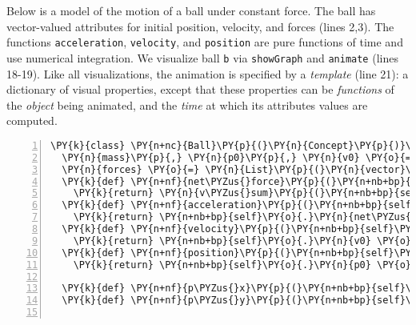 \documentclass[letterpaper,compsoc,twoside]{IEEEtran}
\makeatletter
\def\PY@reset{\let\PY@it=\relax \let\PY@bf=\relax \let\PY@ul=\relax \let\PY@tc=\relax \let\PY@bc=\relax \let\PY@ff=\relax}
\def\PY@tok#1{\csname PY@tok@#1\endcsname}
\def\PY@toks#1+{\ifx\relax#1\empty\else \PY@tok{#1}\expandafter\PY@toks\fi}
\def\PY@do#1{\PY@bc{\PY@tc{\PY@ul{\PY@it{\PY@bf{\PY@ff{#1}}}}}}}
\def\PY#1#2{\PY@reset\PY@toks#1+\relax+\PY@do{#2}}
\def\PYZus{\char`\_}
\makeatother
\begin{document}
Below is a model of the motion of a ball under constant force. The ball has vector-valued attributes for initial position, velocity, and forces (lines 2,3). The functions \texttt{acceleration}, \texttt{velocity}, and \texttt{position} are pure functions of time and use numerical integration. We visualize ball \texttt{b} via \texttt{showGraph} and \texttt{animate} (lines 18-19). Like all visualizations, the animation is specified by a \emph{template} (line 21): a dictionary of visual properties, except that these properties can be \emph{functions} of the \emph{object} being animated, and the \emph{time} at which its attributes values are computed.\begin{Verbatim}[commandchars=\\\{\},numbers=left,firstnumber=1,stepnumber=1,fontsize=\footnotesize,xleftmargin=2.25mm,numbersep=3pt]
\PY{k}{class} \PY{n+nc}{Ball}\PY{p}{(}\PY{n}{Concept}\PY{p}{)}\PY{p}{:}
  \PY{n}{mass}\PY{p}{,} \PY{n}{p0}\PY{p}{,} \PY{n}{v0} \PY{o}{=} \PY{n}{Float}\PY{p}{,} \PY{n}{Instance}\PY{p}{(}\PY{n}{vector}\PY{p}{)}\PY{p}{,} \PY{o}{.}\PY{o}{.}\PY{o}{.}
  \PY{n}{forces} \PY{o}{=} \PY{n}{List}\PY{p}{(}\PY{n}{vector}\PY{p}{)}
  \PY{k}{def} \PY{n+nf}{net\PYZus{}force}\PY{p}{(}\PY{n+nb+bp}{self}\PY{p}{)}\PY{p}{:}
    \PY{k}{return} \PY{n}{v\PYZus{}sum}\PY{p}{(}\PY{n+nb+bp}{self}\PY{o}{.}\PY{n}{forces}\PY{p}{)}
  \PY{k}{def} \PY{n+nf}{acceleration}\PY{p}{(}\PY{n+nb+bp}{self}\PY{p}{,} \PY{n}{time}\PY{p}{)}\PY{p}{:}
    \PY{k}{return} \PY{n+nb+bp}{self}\PY{o}{.}\PY{n}{net\PYZus{}force}\PY{p}{(}\PY{p}{)} \PY{o}{/} \PY{n+nb+bp}{self}\PY{o}{.}\PY{n}{mass}
  \PY{k}{def} \PY{n+nf}{velocity}\PY{p}{(}\PY{n+nb+bp}{self}\PY{p}{,} \PY{n}{time}\PY{p}{)}\PY{p}{:}
    \PY{k}{return} \PY{n+nb+bp}{self}\PY{o}{.}\PY{n}{v0} \PY{o}{+} \PY{n}{v\PYZus{}integrate}\PY{p}{(}\PY{n+nb+bp}{self}\PY{o}{.}\PY{n}{acceleration}\PY{p}{,} \PY{n}{time}\PY{p}{)}
  \PY{k}{def} \PY{n+nf}{position}\PY{p}{(}\PY{n+nb+bp}{self}\PY{p}{,} \PY{n}{time}\PY{p}{)}\PY{p}{:}
    \PY{k}{return} \PY{n+nb+bp}{self}\PY{o}{.}\PY{n}{p0} \PY{o}{+} \PY{n}{v\PYZus{}integrate}\PY{p}{(}\PY{n+nb+bp}{self}\PY{o}{.}\PY{n}{velocity}\PY{p}{,} \PY{n}{time}\PY{p}{)}

  \PY{k}{def} \PY{n+nf}{p\PYZus{}x}\PY{p}{(}\PY{n+nb+bp}{self}\PY{p}{,} \PY{n}{time}\PY{p}{)}\PY{p}{:} \PY{o}{.}\PY{o}{.}\PY{o}{.}\PY{o}{.}
  \PY{k}{def} \PY{n+nf}{p\PYZus{}y}\PY{p}{(}\PY{n+nb+bp}{self}\PY{p}{,} \PY{n}{time}\PY{p}{)}\PY{p}{:} \PY{o}{.}\PY{o}{.}\PY{o}{.}\PY{o}{.}


\end{Verbatim}
\end{document}
